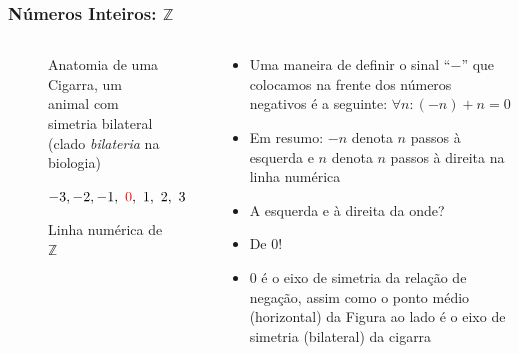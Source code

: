 \documentclass[usenames,dvipsnames,svgnames]{beamer}
\begin{document}
\begin{frame}	
	\frametitle{Números Inteiros: $\mathbb{Z}$}

	\begin{columns}[t]
	\begin{column}{.3\textwidth}
		\begin{figure}
			\caption{\small Anatomia de uma Cigarra, um animal com simetria bilateral (clado \emph{bilateria} na biologia)}
		\end{figure}
		\begin{figure}
			\small $-3, -2, -1, ~{\color{red}0}, ~1, ~2, ~3$
			\caption{\small Linha numérica de $\mathbb{Z}$}
		\end{figure}
	\end{column}
	\begin{column}{.7\textwidth}
		\begin{itemize}
		\item Uma maneira de definir o sinal ``$-$'' que colocamos na frente dos números negativos é a seguinte: $\forall n: (-n) + n = 0$
		\item Em resumo: $-n$ denota $n$ passos à esquerda e $n$ denota $n$ passos à direita na linha numérica
		\item A esquerda e à direita da onde?
		\item {\color{red}De $0$!}
		\item $0$ é o {\color{blue}eixo de simetria} da relação de negação, assim como o ponto médio (horizontal) da Figura ao lado é o eixo de simetria (bilateral) da cigarra
		\end{itemize}
	\end{column}
	\end{columns}
\end{frame}
\end{document}
